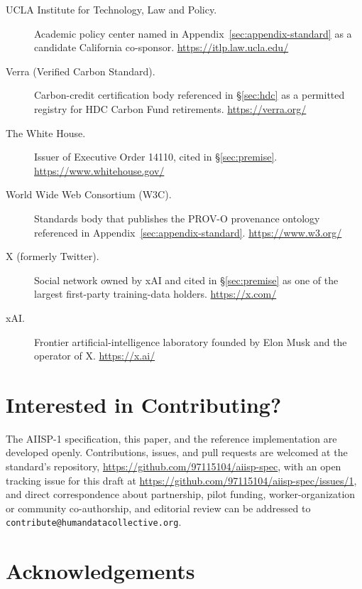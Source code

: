 \documentclass[10pt,a4paper,twocolumn]{article}
\begin{document}
\begin{description}
\item[UCLA Institute for Technology, Law and Policy.] Academic policy center named in Appendix~\ref{sec:appendix-standard} as a candidate California co-sponsor. \url{https://itlp.law.ucla.edu/}

\item[Verra (Verified Carbon Standard).] Carbon-credit certification body referenced in \S\ref{sec:hdc} as a permitted registry for HDC Carbon Fund retirements. \url{https://verra.org/}

\item[The White House.] Issuer of Executive Order 14110, cited in \S\ref{sec:premise}. \url{https://www.whitehouse.gov/}

\item[World Wide Web Consortium (W3C).] Standards body that publishes the PROV-O provenance ontology referenced in Appendix~\ref{sec:appendix-standard}. \url{https://www.w3.org/}

\item[X (formerly Twitter).] Social network owned by xAI and cited in \S\ref{sec:premise} as one of the largest first-party training-data holders. \url{https://x.com/}

\item[xAI.] Frontier artificial-intelligence laboratory founded by Elon Musk and the operator of X. \url{https://x.ai/}

\end{description}

\section*{Interested in Contributing?}

The AIISP-1 specification, this paper, and the reference implementation are developed openly. Contributions, issues, and pull requests are welcomed at the standard's repository, \url{https://github.com/97115104/aiisp-spec}, with an open tracking issue for this draft at \url{https://github.com/97115104/aiisp-spec/issues/1}, and direct correspondence about partnership, pilot funding, worker-organization or community co-authorship, and editorial review can be addressed to \texttt{contribute@humandatacollective.org}.

\onecolumn
\newpage

\section*{Acknowledgements}
\end{document}
